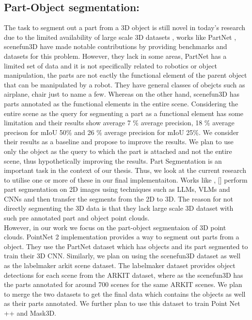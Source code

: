  \subsection{Part-Object segmentation:}
The task to segment out a part from a 3D object is still novel in today's research due to the limited availability of large scale 3D datasets
, works like PartNet \cite{Mo_2019_CVPR}, scenefun3D \cite{delitzas2024scenefun3d} have made notable contributions by providing benchmarks and datasets for this problem. 
However, they lack in some areas, PartNet has a limited set of data and it is not specifically related to robotics or object manipulation, the parts are not
eactly the functional element of the parent object that can be manipulated by a robot. They have general
classes of obejcts such as airplane, chair just to name a few. Whereas on the other hand, scenefun3D has parts annotated as the functional elements in the entire scene. Considering
the entire scene as the query for segmenting a part as a functional element has some limitation and their results show average 7 \% average precision, 18 \% average precison for mIoU 
50\% and 26 \% average precision for mIoU 25\%. We consider their results as a baseline and propose to improve the results. 
We plan to use only the object as the query to which the part is attached and not the entire scene, thus hypothetically improving the results.
Part Segmentation is an important task in the context of our thesis. Thus, we look at the current research to utilise one or more of these
in our final implementaiton. Works like \cite{Liu_2023_CVPR}, \cite{10.1007/978-3-031-72652-1_25} [] perform part segmentation on 2D images using techniques such as LLMs, VLMs and CNNs and then transfer the 
segments from the 2D to 3D. The reason for not directly segmenting the 3D data is that they lack large scale 3D dataset with such pre annotated part
and object point clouds. \\
However, in our work we focus on the part-object segmentaion of 3D point clouds. PointNet 2 implementation provides a way to segment out parts from a object. 
They use the PartNet dataset which has objects and its part segmented to train their 3D CNN. Similarly, we plan on using the scenefun3D dataset as well as 
the labelmaker arkit scene dataset. The labelmaker dataset provides object detections for each scene from the ARKIT dataset, where as the scenefun3D has
the parts annotated for around 700 scenes for the same ARKIT scenes. We plan to merge the two datasets to get the final data which contains the objects as 
well as their parts annotated. We further plan to use this dataset to train Point Net ++ and Mask3D.
